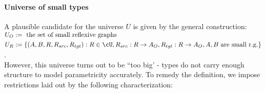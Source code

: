 \documentclass[12pt,a4paper]{article}
\def\src{_{src}}
\def\tgt{_{tgt}}
\renewcommand{\O}{_{O}}\alwaysmath{O}
\newcommand{\R}{\ensuremath{_{R}}}
\begin{document}
\paragraph*{Universe of small types}
A plausible candidate for the universe $U$ is given by  the general construction:\\
$\begin{aligned}
  U\O &\define \text{ the set of small reflexive graphs} \\
  U\R &\define \{(A, B, R, R\src, R\tgt) : R \in \cU, R\src: R \to A\O, R\tgt : R \to A\O, A,B \text{ are small r.g.}   \}
\end{aligned}$.\\

However, this universe turns out to be ``too big' - types do not carry enough structure to model parametricity accurately. To remedy the definition, we impose restrictions laid out by the following characterization:\\
\end{document}
